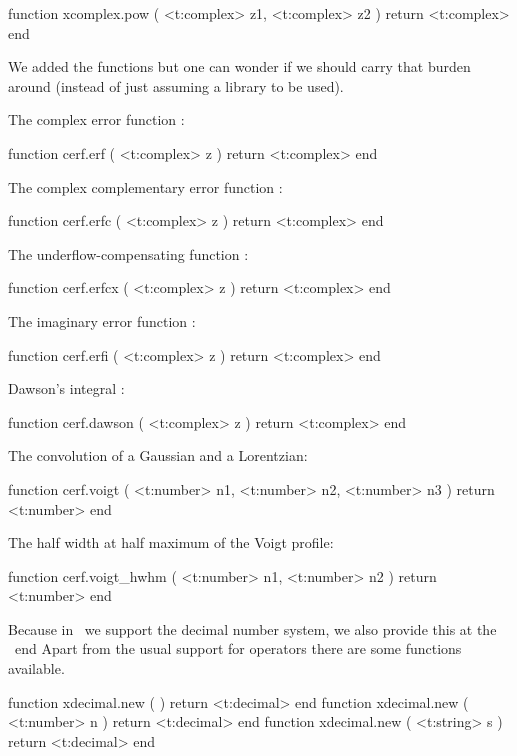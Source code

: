function xcomplex.pow   ( <t:complex> z1, <t:complex> z2 ) return <t:complex> end
\stoptyping

We added the  functions but one can wonder if we should carry that
burden around (instead of just assuming a library to be used).

The complex error function :

\starttyping[option=LUA]
function cerf.erf ( <t:complex> z )
    return <t:complex>
end
\stoptyping

The complex complementary error function :

\starttyping[option=LUA]
function cerf.erfc ( <t:complex> z )
    return <t:complex>
end
\stoptyping

The underflow-compensating function :

\starttyping[option=LUA]
function cerf.erfcx ( <t:complex> z )
    return <t:complex>
end
\stoptyping

The imaginary error function :

\starttyping[option=LUA]
function cerf.erfi ( <t:complex> z )
    return <t:complex>
end
\stoptyping

Dawson's integral :

\starttyping[option=LUA]
function cerf.dawson ( <t:complex> z )
    return <t:complex>
end
\stoptyping

The convolution of a Gaussian and a Lorentzian:

\starttyping[option=LUA]
function cerf.voigt (
    <t:number> n1,
    <t:number> n2,
    <t:number> n3
)
    return <t:number>
end
\stoptyping

The half width at half maximum of the Voigt profile:

\starttyping[option=LUA]
function cerf.voigt_hwhm (
    <t:number> n1,
    <t:number> n2
)
    return <t:number>
end
\stoptyping

\stopsubsection

\startsubsection[title=Decimal numbers]

Because in \METAPOST\ we support the decimal number system, we also provide this
at the \TEX\ end Apart from the usual support for operators there are some
functions available.

\starttyping[option=LUA]
function xdecimal.new ( )              return <t:decimal> end
function xdecimal.new ( <t:number> n ) return <t:decimal> end
function xdecimal.new ( <t:string> s ) return <t:decimal> end
\stoptyping

